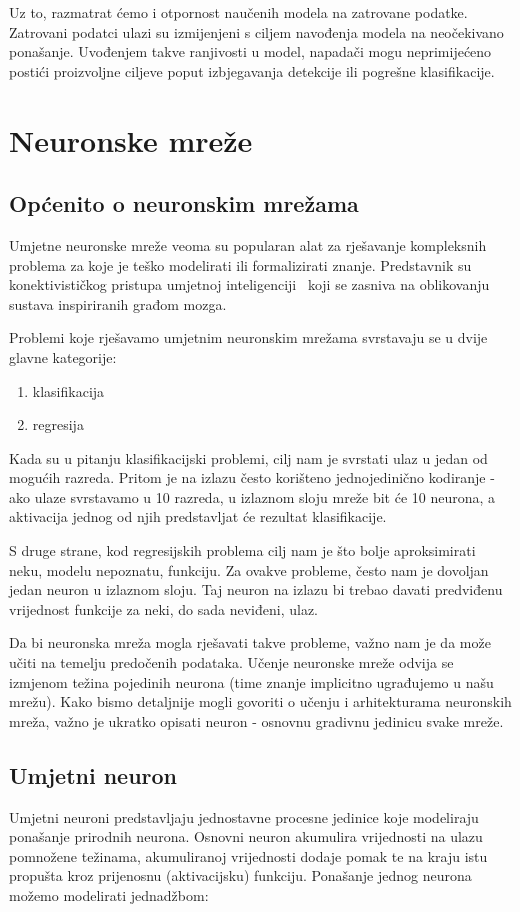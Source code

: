 \documentclass[times, utf8, zavrsni, numeric]{fer}
\begin{document}
Uz to, razmatrat ćemo i otpornost naučenih modela na zatrovane podatke. Zatrovani podatci ulazi su izmijenjeni s ciljem navođenja modela na neočekivano ponašanje. 
Uvođenjem takve ranjivosti u model, napadači mogu neprimijećeno postići proizvoljne ciljeve poput izbjegavanja detekcije ili pogrešne klasifikacije.

\chapter{Neuronske mreže}
\section{Općenito o neuronskim mrežama}
Umjetne neuronske mreže veoma su popularan alat za rješavanje kompleksnih problema za koje je teško modelirati ili formalizirati znanje. 
Predstavnik su konektivističkog pristupa umjetnoj inteligenciji~\cite{uui2020} koji se zasniva na oblikovanju sustava inspiriranih građom mozga.

Problemi koje rješavamo umjetnim neuronskim mrežama svrstavaju se u dvije glavne kategorije:
\begin{enumerate}
    \item klasifikacija 
    \item regresija
\end{enumerate}

Kada su u pitanju klasifikacijski problemi, cilj nam je svrstati ulaz u jedan od mogućih razreda. 
Pritom je na izlazu često korišteno jednojedinično kodiranje - ako ulaze svrstavamo u 10 razreda, u izlaznom sloju mreže bit će 10 neurona, a aktivacija jednog od njih predstavljat će rezultat klasifikacije.

S druge strane, kod regresijskih problema cilj nam je što bolje aproksimirati neku, modelu nepoznatu, funkciju. Za ovakve probleme, često nam je dovoljan jedan neuron u izlaznom sloju. 
Taj neuron na izlazu bi trebao davati predviđenu vrijednost funkcije za neki, do sada neviđeni, ulaz.

Da bi neuronska mreža mogla rješavati takve probleme, važno nam je da može učiti na temelju predočenih podataka. Učenje neuronske mreže odvija se izmjenom težina pojedinih neurona (time znanje implicitno ugrađujemo u našu mrežu).
Kako bismo detaljnije mogli govoriti o učenju i arhitekturama neuronskih mreža, važno je ukratko opisati neuron - osnovnu gradivnu jedinicu svake mreže.
\pagebreak
\section{Umjetni neuron}
Umjetni neuroni predstavljaju jednostavne procesne jedinice koje modeliraju ponašanje prirodnih neurona. Osnovni neuron akumulira vrijednosti na ulazu pomnožene težinama, 
akumuliranoj vrijednosti dodaje pomak te na kraju istu propušta kroz prijenosnu (aktivacijsku) funkciju. Ponašanje jednog neurona možemo modelirati jednadžbom:
\end{document}
